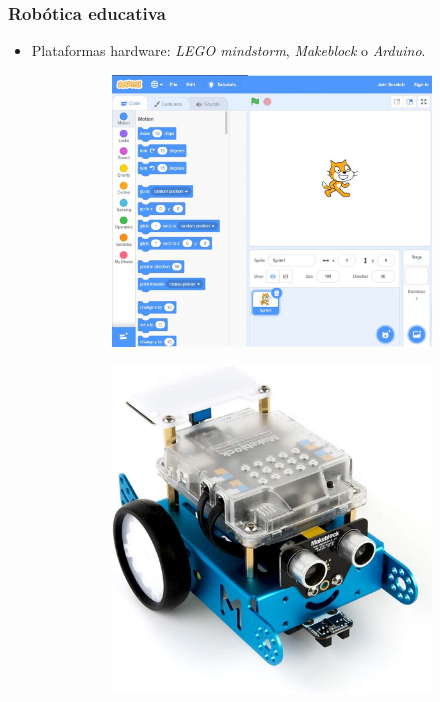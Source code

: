 \documentclass[xcolor={table}]{beamer}
\begin{document}
	\begin{frame}
		\frametitle{Robótica educativa}
		\begin{itemize}
	          \item Plataformas hardware: \textit{LEGO mindstorm}, \textit{Makeblock} o \textit{Arduino}.
        \begin{figure}[H]
        \centering
        \begin{subfigure}{\textwidth}
            \includegraphics[scale=0.13]{img/scratch.jpg}
        \label{fig:scratch}
        \end{subfigure}\hfill
        \begin{subfigure}{\textwidth}
            \includegraphics[scale=0.1]{img/mBotReal.jpg}

\end{subfigure}
\end{figure}
\end{itemize}
\end{frame}
\end{document}
